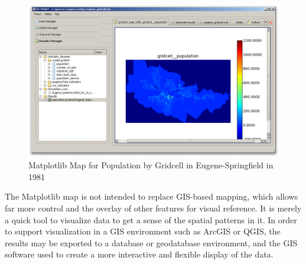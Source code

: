 \begin{figure}[htp]
\begin{center}
\includegraphics[scale=0.4]{graphics/opus-indicator-view-2.png}
\end{center}
\caption{Matplotlib Map for Population by Gridcell in Eugene-Springfield in 1981}
\label{fig:opus-indicator-view-2}
\end{figure}

The Matplotlib map is not intended to replace GIS-based mapping, which allows far more control and the overlay of other features for visual reference.  It is merely a quick tool to visualize data to get a sense of the spatial patterns in it.  In order to support visualization in a GIS environment such as ArcGIS or QGIS, the results may be exported to a database or geodatabase environment, and the GIS software used to create a more interactive and flexible display of the data.



